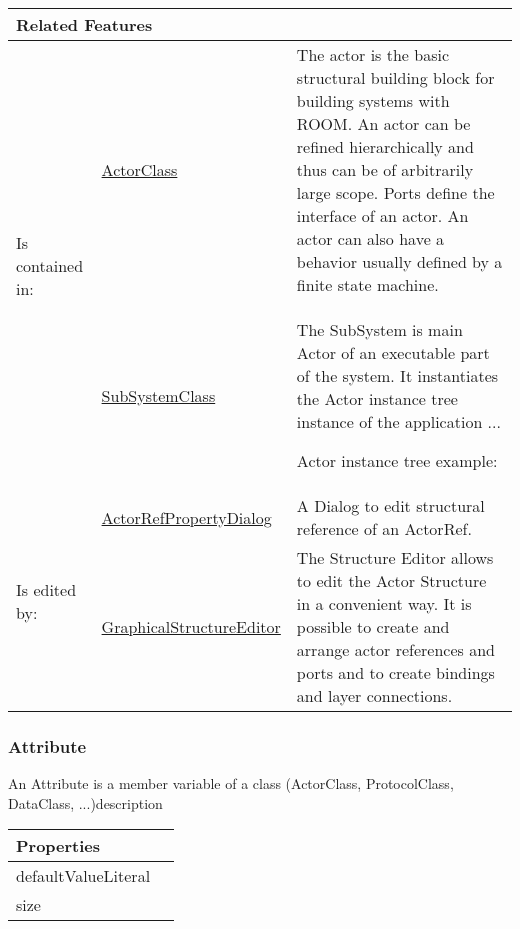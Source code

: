 			\vspace{\baselineskip}
			\begingroup
			\renewcommand{\arraystretch}{1.8} %
			\parbox{\textwidth}{
			\begin{longtable}{l l p{}}
				\multicolumn{2}{l}{\textbf{\large Related Features}} & \\
				\hline
			\multirow{2}{*}{Is contained in:} & \tabitem \hyperlink{ref:ActorClass}{ActorClass}  & The actor is the basic structural building block for building systems with ROOM. An actor can be refined hierarchically and thus can be of arbitrarily large scope. Ports define the interface of an actor. An actor can also have a behavior usually defined by a finite state machine. \\
			& \tabitem \hyperlink{ref:SubSystemClass}{SubSystemClass}  & The SubSystem is main Actor of an executable part of the system. It instantiates the Actor instance tree instance of the application ...
				
				Actor instance tree example:
			 \\
			\hline
			\multirow{2}{*}{Is edited by:} & \tabitem \hyperlink{ref:ActorRefPropertyDialog}{ActorRefPropertyDialog}  & A Dialog to edit structural reference of an ActorRef.
			\\
			& \tabitem \hyperlink{ref:GraphicalStructureEditor}{GraphicalStructureEditor}  & The Structure Editor allows to edit the Actor Structure in a convenient way. It is possible to create and arrange actor references and ports and to create bindings and layer connections. \\
			\hline
			\end{longtable}	
			}
			\endgroup
			\vspace{\baselineskip}
			
			
		
		\subsubsection{Attribute}
			\hypertarget{ref:Attribute}{}
			
			An Attribute is a member variable of a class (ActorClass, ProtocolClass, DataClass, ...)description 
			
			\vspace{\baselineskip}
			\begingroup
			\renewcommand{\arraystretch}{1.8} %
			\parbox{\textwidth}{
			\begin{longtable}{l p{}}
				\multicolumn{2}{l}{\textbf{\large Properties}} \\
				\hline
			\tabitem defaultValueLiteral & \\
			\tabitem size & \\
			\end{longtable}	
			}
			\endgroup
			\vspace{\baselineskip}
			
